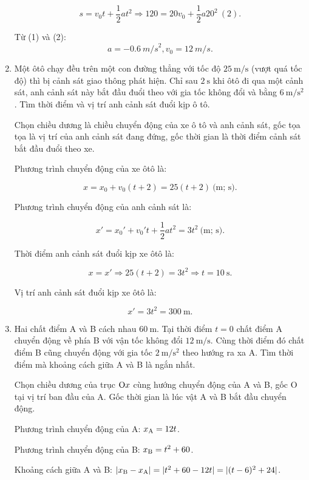 \begin{enumerate}[label=\bfseries Câu \arabic*:]
{		$$s = v_0t + \dfrac{1}{2}at^2 \Rightarrow 120 = 20v_0 + \dfrac{1}{2} a 20^2\ (2).$$
		
		Từ (1) và (2): $$a = - \SI{0,6}{m/s}^2, v_0 = \SI{12}{m/s}.$$
	}
	\item {}
	
	
	{
		Một ôtô chạy đều trên một con đường thẳng với tốc độ $\SI{25}{\meter/\second}$ (vượt quá tốc độ) thì bị cảnh sát giao thông phát hiện. Chỉ sau $\SI{2}{\second}$ khi ôtô đi qua một cảnh sát, anh cảnh sát này bắt đầu đuổi theo với gia tốc không đổi và bằng $\SI{6}{\meter/\second^2}$. Tìm thời điểm và vị trí anh cảnh sát đuổi kịp ô tô.
	}
	
	\hideall
	{	
		Chọn chiều dương là chiều chuyển động của xe ô tô và anh cảnh sát, gốc tọa tọa là vị trí của anh cảnh sát đang đứng, gốc thời gian là thời điểm cảnh sát bắt đầu đuổi theo xe.
		
		Phương trình chuyển động của xe ôtô là:
		
		$$x=x_0+v_0(t+2)=25(t+2)\ \text{(m; s)}.$$
		
		Phương trình chuyển động của anh cảnh sát là:
		
		$$x'=x_0'+v_0't+\dfrac{1}{2}at^2=3t^2\ \text{(m; s)}.$$
		
		Thời điểm anh cảnh sát đuổi kịp xe ôtô là:
		
		$$x=x'\Rightarrow 25(t+2)=3t^2\Rightarrow t=\SI{10}{\second}.$$
		
		Vị trí anh cảnh sát đuổi kịp xe ôtô là:
		
		$$x'=3t^2=\SI{300}{\meter}.$$
	}
	\item {}
	
	
	{
		Hai chất điểm A và B cách nhau $\SI{60}{\meter}$. Tại thời điểm $t=0$ chất điểm A chuyển động về phía B với vận tốc không đổi $\SI{12}{\meter / \second}$. Cùng thời điểm đó chất điểm B cũng chuyển động với gia tốc $\SI{2}{\meter / \second \squared}$ theo hướng ra xa A. Tìm thời điểm mà khoảng cách giữa A và B là ngắn nhất.
	}
	
	\hideall
	{Chọn chiều dương của trục $\text O x$ cùng hướng chuyển động của A và B, gốc O tại vị trí ban đầu của A. Gốc thời gian là lúc vật A và B bắt đầu chuyển động.
		
		Phương trình chuyển động của A: $x_\text A = 12t$.
		
		Phương trình chuyển động của B: $x_\text B = t^2 + 60$.
		
		Khoảng cách giữa A và B: $|x_\text B - x_\text A |=|t^2+60-12t|=|(t-6)^2+24|$.
		
}
\end{enumerate}
